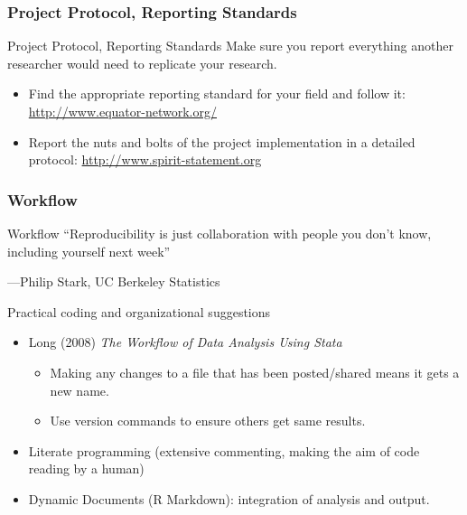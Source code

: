 \documentclass{beamer}
\begin{document}
\subsubsection*{Project Protocol, Reporting Standards}
\begin{frame}[<.->]{Project Protocol, Reporting Standards}
 Make sure you report everything another researcher would need to replicate your research.
 \begin{itemize}
 \item Find the appropriate reporting standard for your field and follow it: \url{http://www.equator-network.org/}
\item Report the nuts and bolts of the project implementation in a detailed protocol: \url{http://www.spirit-statement.org}
\end{itemize}
\end{frame}

 \subsubsection*{Workflow}
 \begin{frame}{Workflow}
``Reproducibility is just collaboration with people you don't know,
including yourself next week''

---Philip Stark, UC Berkeley Statistics

\vspace{0.15in}

Practical coding and organizational suggestions
 \begin{itemize}
 \item Long (2008) \textit{The Workflow of Data Analysis Using Stata}
 \begin{itemize}
 	\item Making any changes to a file that has been posted/shared means it gets a new name.
 	\item Use version commands to ensure others get same results.
  \end{itemize}
 \item Literate programming (extensive commenting, making the aim of code reading by a human)
 \item Dynamic Documents (R Markdown): integration of analysis and output.
\end{itemize}
\end{frame}
\end{document}
